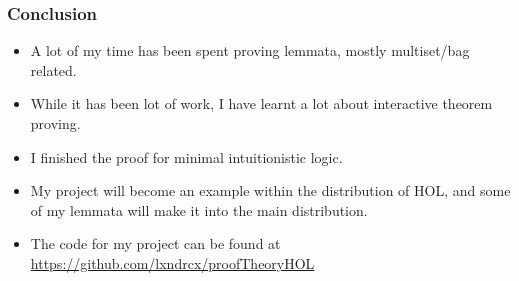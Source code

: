 \documentclass[english,svgnames,hide notes,12pt]{beamer}
\theoremstyle{definition}
\theoremstyle{remark}
\begin{document}
\begin{frame}
    \frametitle{Conclusion}
    \begin{itemize}
        \item A lot of my time has been spent proving lemmata, mostly multiset/bag related.
        \item While it has been lot of work, I have learnt a lot about interactive theorem proving.
        \item I finished the proof for minimal intuitionistic logic.
        \item My project will become an example within the distribution of HOL, and some of my lemmata will make it into the main distribution.
        \item The code for my project can be found at \url{https://github.com/lxndrcx/proofTheoryHOL}
    \end{itemize}
\end{frame}
\end{document}
